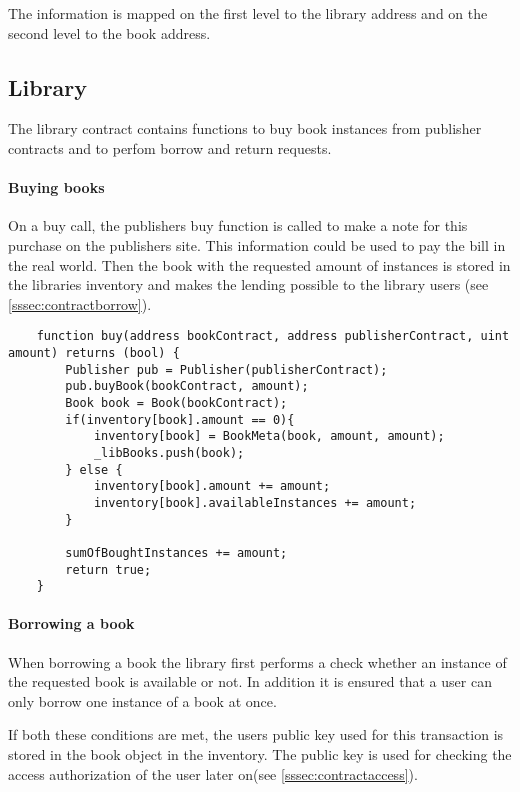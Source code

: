 The information is mapped on the first level to the library address and on the second level to the book address.

\subsection{Library}
The library contract contains functions to buy book instances from publisher contracts and to perfom borrow and return requests.

\paragraph*{Buying books}
On a buy call, the publishers buy function is called to make a note for this purchase on the publishers site. This information could be used to pay the bill in the real world.
Then the book with the requested amount of instances is stored in the libraries inventory and makes the lending possible to the library users (see \ref{sssec:contractborrow}).

\begin{lstlisting}
	function buy(address bookContract, address publisherContract, uint amount) returns (bool) {
		Publisher pub = Publisher(publisherContract);
		pub.buyBook(bookContract, amount);
        Book book = Book(bookContract);
        if(inventory[book].amount == 0){
            inventory[book] = BookMeta(book, amount, amount);
		    _libBooks.push(book);
		} else {
            inventory[book].amount += amount;
            inventory[book].availableInstances += amount;
		}

		sumOfBoughtInstances += amount;
		return true;
	}
\end{lstlisting}


\paragraph*{Borrowing a book \label{sssec:contractborrow}}
When borrowing a book the library first performs a check whether an instance of the requested book is available or not. In addition it is ensured that a user can only borrow one instance of a book at once. 

If both these conditions are met, the users public key used for this transaction is stored in the book object in the inventory. The public key is used for checking the access authorization of the user later on(see \ref{sssec:contractaccess}).

